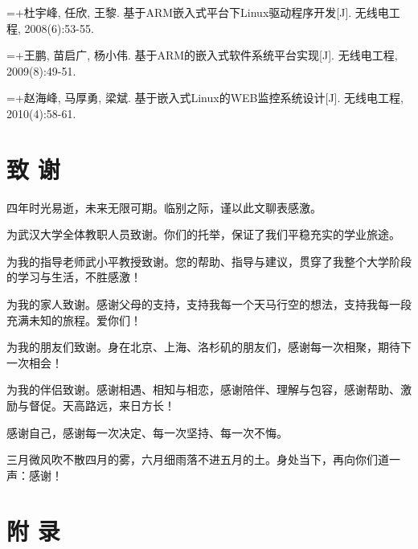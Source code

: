 {\noindent\hangindent=\dimexpr\thesisrefnumwd+\thesisrefgap\relax{}\makebox[\thesisrefnumwd][l]{[28]}\nobreak\hspace{\thesisrefgap}杜宇峰, 任欣, 王黎. 基于ARM嵌入式平台下Linux驱动程序开发{[}J{]}. 无线电工程, 2008(6):53-55.\par

\noindent\hangindent=\dimexpr\thesisrefnumwd+\thesisrefgap\relax{}\makebox[\thesisrefnumwd][l]{[29]}\nobreak\hspace{\thesisrefgap}王鹏, 苗启广, 杨小伟. 基于ARM的嵌入式软件系统平台实现{[}J{]}. 无线电工程, 2009(8):49-51.\par

\noindent\hangindent=\dimexpr\thesisrefnumwd+\thesisrefgap\relax{}\makebox[\thesisrefnumwd][l]{[30]}\nobreak\hspace{\thesisrefgap}赵海峰, 马厚勇, 梁斌. 基于嵌入式Linux的WEB监控系统设计{[}J{]}. 无线电工程, 2010(4):58-61.\par

}

\clearpage

\section*{致 谢}


四年时光易逝，未来无限可期。临别之际，谨以此文聊表感激。

为武汉大学全体教职人员致谢。你们的托举，保证了我们平稳充实的学业旅途。

为我的指导老师武小平教授致谢。您的帮助、指导与建议，贯穿了我整个大学阶段的学习与生活，不胜感激！

为我的家人致谢。感谢父母的支持，支持我每一个天马行空的想法，支持我每一段充满未知的旅程。爱你们！

为我的朋友们致谢。身在北京、上海、洛杉矶的朋友们，感谢每一次相聚，期待下一次相会！

为我的伴侣致谢。感谢相遇、相知与相恋，感谢陪伴、理解与包容，感谢帮助、激励与督促。天高路远，来日方长！

感谢自己，感谢每一次决定、每一次坚持、每一次不悔。

三月微风吹不散四月的雾，六月细雨落不进五月的土。身处当下，再向你们道一声：感谢！

\clearpage

\section*{附 录}

